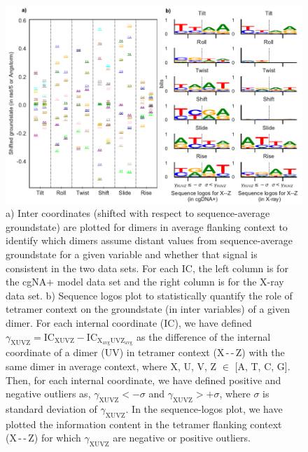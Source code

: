 \begin{figure}
	\begin{center}
	\centering\includegraphics[scale=1]{./Xray_images/X3_logo_inter_mono-flank_bits.pdf}
	\centering\caption{
a) Inter coordinates (shifted with respect to sequence-average groundstate) are plotted for dimers in average flanking context to identify which dimers assume distant values from sequence-average groundstate for a given variable and whether that signal is consistent in the two data sets. 
For each IC, the left column is for the cgNA$+$ model data set and the right column is for the X-ray data set. 
b) Sequence logos plot to statistically quantify the role of tetramer context on the groundstate (in inter variables) of a given dimer.
For each internal coordinate (IC), we have defined $\gamma_{\text{XUVZ}}= \text{IC}_{\text{XUVZ}} - \text{IC}_{\text{X}_{\text{avg}}\text{UV}\text{Z}_{\text{avg}}}$ as the difference of the internal coordinate of a dimer (UV) in tetramer context (X\,-\,-\,Z) with the same dimer in average context, where X, U, V, Z $\in$ [A, T, C, G]. 
Then, for each internal coordinate, we have defined positive and negative outliers as, $ \gamma_{\text{XUVZ}} < -\sigma$ and $ \gamma_{\text{XUVZ}} > +\sigma$, where $\sigma$ is standard deviation of $\gamma_{\text{XUVZ}}$.
In the sequence-logos plot, we have plotted the information content in the tetramer flanking context (X\,-\,-\,Z) for which $\gamma_{\text{XUVZ}}$ are negative or positive outliers.
}
\label{fig:logo_bits}
\end{center}
\end{figure}


